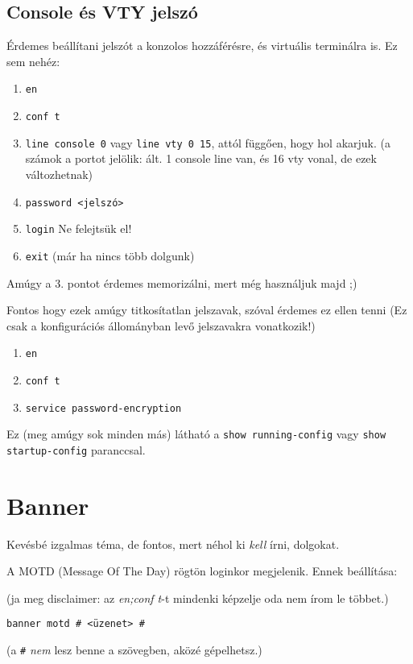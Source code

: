 \subsection{Console és VTY jelszó}
Érdemes beállítani jelszót a konzolos hozzáférésre, és virtuális terminálra is.
Ez sem nehéz:
\begin{parancs}
\begin{enumerate}
	\item \verb|en| 
	\item \verb|conf t|
	\item \verb|line console 0| vagy \verb|line vty 0 15|, attól függően, hogy hol akarjuk. (a számok a portot jelölik: ált. 1 console line van, és 16 vty vonal, de ezek változhetnak)
	\item \verb|password <jelszó>|
	\item \verb|login| Ne felejtsük el!
	\item \verb|exit| (már ha nincs több dolgunk)
\end{enumerate}

\end{parancs} 
Amúgy a 3. pontot érdemes memorizálni, mert még használjuk majd ;)


Fontos hogy ezek amúgy titkosítatlan jelszavak, szóval érdemes ez ellen tenni (Ez csak a konfigurációs állományban levő jelszavakra vonatkozik!)
\begin{parancs}
\begin{enumerate}
	\item \verb|en| 
	\item \verb|conf t|
	\item \verb|service password-encryption|
\end{enumerate}

\end{parancs} 
Ez (meg amúgy sok minden más) látható a \verb|show running-config| vagy \verb|show startup-config| paranccsal.

\section{Banner}
Kevésbé izgalmas téma, de fontos, mert néhol ki \emph{ kell }írni, dolgokat.

A MOTD (Message Of The Day) rögtön loginkor megjelenik.
Ennek beállítása:

(ja meg disclaimer: az \emph{en;conf t}-t mindenki képzelje oda nem írom le többet.)
\begin{parancs}
\verb|banner motd # <üzenet> #|

(a \verb|#| \emph{nem} lesz benne a szövegben, aközé gépelhetsz.)
\end{parancs}

